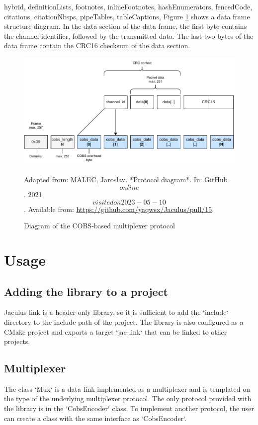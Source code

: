 \begin{markdown*}{%
  hybrid,
  definitionLists,
  footnotes,
  inlineFootnotes,
  hashEnumerators,
  fencedCode,
  citations,
  citationNbsps,
  pipeTables,
  tableCaptions,
}
Figure \ref{fig:cobs-diagram} shows a data frame structure diagram. In the data section of the data frame, the first byte contains the channel identifier, followed by the transmitted data. The last two bytes of the data frame contain the CRC16 checksum of the data section.


\begin{figure}[!ht]
    \centering
    \includegraphics[width=\textwidth]{img/cobs-diagram}
    \raggedright
    \footnotesize{Adapted from: MALEC, Jaroslav. *Protocol diagram*. In: GitHub \[online\]. 2021 \[visited on 2023-05-10\]. Available from: \url{https://github.com/yaqwsx/Jaculus/pull/15}.}
    \caption{Diagram of the COBS-based multiplexer protocol}
    \label{fig:cobs-diagram}
\end{figure}


\section{Usage}

\subsection{Adding the library to a project}

Jaculus-link is a header-only library, so it is sufficient to add the `include` directory to the include path of the project. The library is also configured as a CMake project and exports a target `jac-link` that can be linked to other projects.

\subsection{Multiplexer}

The class `Mux` is a data link implemented as a multiplexer and is templated on the type of the underlying multiplexer protocol. The only protocol provided with the library is in the `CobsEncoder` class. To implement another protocol, the user can create a class with the same interface as `CobsEncoder`.


\end{markdown*}
